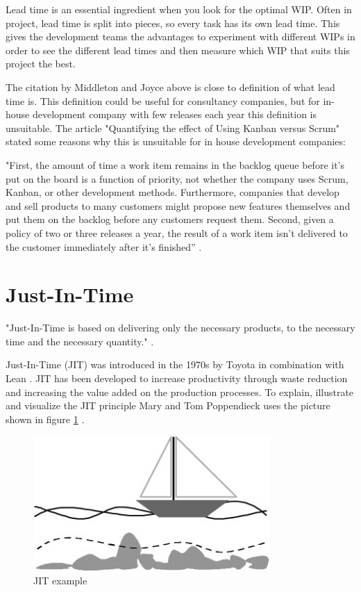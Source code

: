 \documentclass[UKenglish]{ifimaster}  %
\begin{document}
Lead time is an essential ingredient when you look for the optimal WIP. Often in project, lead time is split into pieces, so every task has its own lead time. This gives the development teams the advantages to experiment with different WIPs in order to see the different lead times and then measure which WIP that suits this project the best. 

The citation by Middleton and Joyce above is close to definition of what lead time is. This definition could be useful for consultancy companies, but for in-house development company with few releases each year this definition is unsuitable. The article "Quantifying the effect of Using Kanban versus Scrum" \parencite{Dag} stated some reasons why this is unsuitable for in house development companies: 

"First, the amount of time a work item remains in the backlog queue before it's put on the board is a function of priority, not whether the company uses Scrum, Kanban, or other development methods. Furthermore, companies that develop and sell products to many customers might propose new features themselves and put them on the backlog before any customers request them. Second, given a policy of two or three releases a year, the result of a work item isn't delivered to the customer immediately after it's finished'' \parencite{Dag}.


\section{Just-In-Time}
"Just-In-Time is based on delivering only the necessary products, to the necessary time and the necessary quantity." \parencite{JIT}.

Just-In-Time (JIT) was introduced in the 1970s by Toyota in combination with Lean \parencite{javadian2013just}.  JIT has been developed to increase productivity through waste reduction and increasing the value added on the production processes. To explain, illustrate and visualize the JIT principle Mary and Tom Poppendieck uses the picture shown in figure \ref{JITE}  \parencite{JIT} \parencite{Lean:2006}.

\begin{figure}[ht!]
\centering
\includegraphics[width=90mm]{Picture/JIT.jpg}
\caption{JIT example}
\label{JITE} %
\end{figure}
\end{document}
